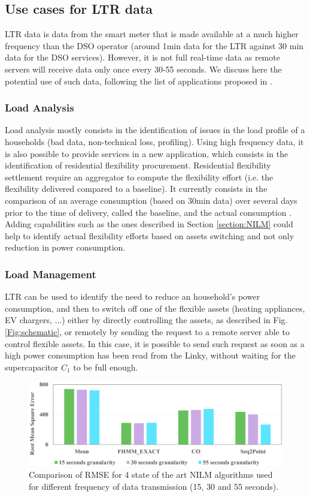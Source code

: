 \documentclass[conference]{IEEEtran}
\begin{document}
 
 \subsection{Use cases for LTR data}
LTR data is data from the smart meter that is made available at a much higher frequency than the DSO operator (around 1min data for the LTR against 30 min data for the DSO services). However, it is not full real-time data as remote servers will receive data only once every 30-55 seconds. We discuss here the potential use of such data, following the list of applications proposed in \cite{IEEE:ReviewSmartMeterData}.
\subsubsection{Load Analysis }
Load analysis mostly consists in the identification of issues in the load profile of a households (bad data, non-technical loss, profiling). Using high frequency data, it is also possible to provide services in a new application, which consists in the identification of residential flexibility procurement. Residential flexibility settlement require an aggregator to compute the flexibility effort (i.e. the flexibility delivered compared to a baseline). It currently consists in the comparison of an average consumption  (based on 30min data) over several days prior to the time of delivery, called the baseline, and the actual consumption \cite{ESO:BaselineP376}. Adding capabilities such as the ones described in Section \ref{section:NILM} could help to identify actual flexibility efforts based on assets switching and not only reduction in power consumption.


\subsubsection{Load Management}
LTR can be used to identify the need to reduce an household's power consumption, and then to switch off one of the flexible assets (heating appliances, EV chargers, ...) either by directly controlling the assets, as described in Fig. \ref{Fig:schematic}, or remotely by sending the request to a remote server able to control flexible assets. In this case, it is possible to send such request as soon as a high power consumption has been read from the Linky, without waiting for the supercapacitor $C_1$ to be full enough.


\begin{figure}[h]
	\centering
	\includegraphics[width=0.85\columnwidth]{Images/NILMComparison}
	\caption{Comparison of  RMSE for 4 state of the art NILM algorithms used for different frequency of data transmission (15, 30 and 55 seconds).}
	\label{Fig:NILMComparison}
\end{figure}
\end{document}

